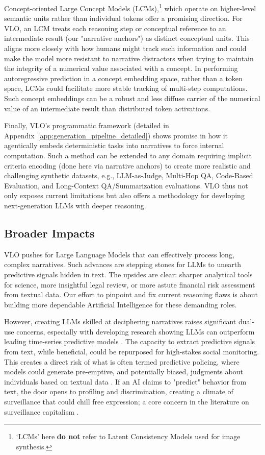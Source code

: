 \documentclass{article}
\begin{document}
Concept-oriented Large Concept Models (LCMs),\footnote{`LCMs' here \textbf{do not} refer to Latent Consistency Models used for image synthesis.}  which operate on higher-level semantic units rather than individual tokens \citep{lcm} offer a promising direction. For VLO, an LCM treats each reasoning step or conceptual reference to an intermediate result (our "narrative anchors") as distinct conceptual units. This aligns more closely with how humans might track such information and could make the model more resistant to narrative distractors when trying to maintain the integrity of a numerical value associated with a concept. In performing autoregressive prediction in a concept embedding space, rather than a token space, LCMs could facilitate more stable tracking of multi-step computations. Such concept embeddings can be a robust and less diffuse carrier of the numerical value of an intermediate result than distributed token activations.

Finally, VLO's programmatic framework (detailed in Appendix~\ref{app:generation_pipeline_detailed}) shows promise in how it agentically embeds deterministic tasks into narratives to force internal computation. Such a method can be extended to any domain requiring implicit criteria encoding (done here via narrative anchors) to create more realistic and challenging synthetic datasets, e.g., LLM-as-Judge, Multi-Hop QA, Code-Based Evaluation, and Long-Context QA/Summarization evaluations. VLO thus not only exposes current limitations but also offers a methodology for developing next-generation LLMs with deeper reasoning.

\subsection*{Broader Impacts}
VLO pushes for Large Language Models that can effectively process long, complex narratives. Such advances are stepping stones for LLMs to unearth predictive signals hidden in  text. The upsides are clear: sharper analytical tools for science, more insightful legal review, or more astute financial risk assessment from textual data. Our effort to pinpoint and fix current reasoning flaws is about building more dependable Artificial Intelligence for these demanding roles.

However, creating LLMs skilled at deciphering narratives raises significant dual-use concerns, especially with developing research showing LLMs can outperform leading time-series predictive models \citep{contextiskey}. The capacity to extract predictive signals from text, while beneficial, could be repurposed for high-stakes social monitoring. This creates a direct risk of what is often termed predictive policing, where models could generate pre-emptive, and potentially biased, judgments about individuals based on textual data \citep{predictive_policing}. If an AI claims to "predict" behavior from text, the door opens to profiling and discrimination, creating a climate of surveillance that could chill free expression; a core concern in the literature on surveillance capitalism \citep{surveillance_capitalism}.
\end{document}
